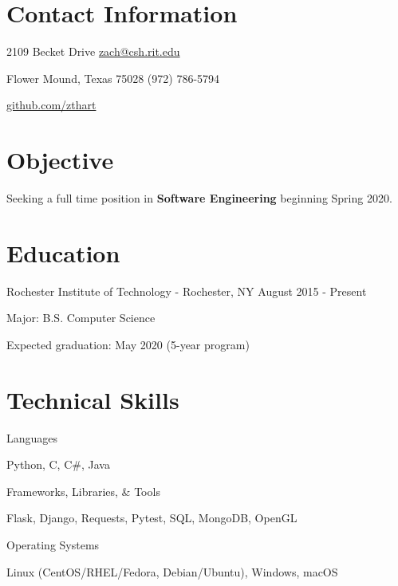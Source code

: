 \documentclass[margin,line]{resume}
\newcommand{\rurl}[1]{\hfill {\footnotesize \url{#1}}}
\newcommand{\rdate}[1]{\hfill {\small #1}}
\begin{document}
\begin{resume}
\section{\mysidestyle Contact Information} 
	\begin{asparablank}
		\item 2109 Becket Drive  \hfill \href{mailto:zach@csh.rit.edu}{zach@csh.rit.edu}
		\item Flower Mound, Texas 75028 \hfill (972) 786-5794
		\item \hfill \rurl{github.com/zthart}
    \end{asparablank}

\section{\mysidestyle Objective}
	\begin{asparablank}
    	\item Seeking a full time position in \textbf{Software Engineering} beginning Spring 2020.
        \normalsize
        \\
	\end{asparablank}

\section{\mysidestyle Education}
	\begin{compactdesc}
		\item[Rochester Institute of Technology] - Rochester, NY \rdate{August 2015 - Present}
		\begin{compactitem} { \small
			\item Major: B.S. Computer Science
			\item Expected graduation: May 2020 (5-year program)
		} \end{compactitem}
	\end{compactdesc}

\section{\mysidestyle Technical Skills}
	\begin{compactdesc}
		\item[Languages] \begin{inparaenum} { \small
			Python, C, C\#, Java
		} \end{inparaenum}
        \item[Frameworks, Libraries, \& Tools] \begin{inparaenum} { \small
        	Flask, Django, Requests, Pytest, SQL, MongoDB, OpenGL
        } \end{inparaenum}
		\item[Operating Systems] \begin{inparaenum} { \small
			Linux (CentOS/RHEL/Fedora, Debian/Ubuntu), Windows, macOS
		} \end{inparaenum}
        \normalsize
	\end{compactdesc}


\end{resume}
\end{document}
